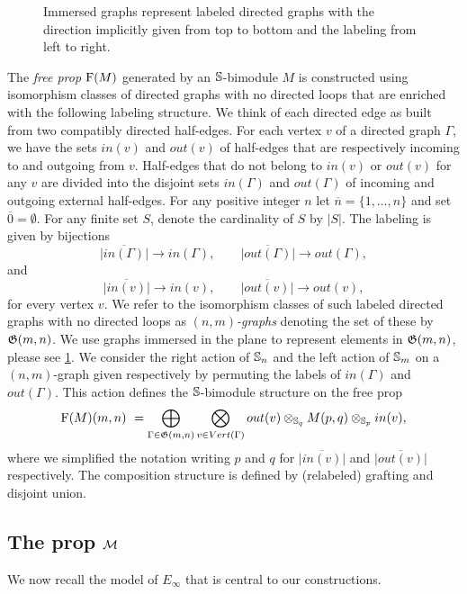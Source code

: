 \begin{figure}
	
	\caption{Immersed graphs represent labeled directed graphs with the direction implicitly given from top to bottom and the labeling from left to right.}
	\label{f:immersion}
\end{figure}

The \textit{free prop} $\free(M)$ generated by an $\S$-bimodule $M$ is constructed using isomorphism classes of directed graphs with no directed loops that are enriched with the following labeling structure.
We think of each directed edge as built from two compatibly directed half-edges.
For each vertex $v$ of a directed graph $\Gamma$, we have the sets $in(v)$ and $out(v)$ of half-edges that are respectively incoming to and outgoing from $v$.
Half-edges that do not belong to $in(v)$ or $out(v)$ for any $v$ are divided into the disjoint sets $in(\Gamma)$ and $out(\Gamma)$ of incoming and outgoing external half-edges.
For any positive integer $n$ let $\overline{n} = \{1, \dots, n\}$ and set $\overline{0} = \emptyset$.
For any finite set $S$, denote the cardinality of $S$ by $|S|$.
The labeling is given by bijections
\[
\overline{|in(\Gamma)|}\to in(\Gamma), \qquad
\overline{|out(\Gamma)|}\to out(\Gamma),
\]
and
\[
\overline{|in(v)|}\to in(v), \qquad
\overline{|out(v)|}\to out(v),
\]
for every vertex $v$.
We refer to the isomorphism classes of such labeled directed graphs with no directed loops as $(n,m)$\textit{-graphs} denoting the set of these by $\graphs(m,n)$.
We use graphs immersed in the plane to represent elements in $\graphs(m,n)$, please see \cref{f:immersion}.
We consider the right action of $\S_n$ and the left action of $\S_m$ on a $(n,m)$-graph given respectively by permuting the labels of $in(\Gamma)$ and $out(\Gamma)$.
This action defines the $\S$-bimodule structure on the free prop
\begin{equation} \label{e:free prop}
\free(M)(m,n) \ = \bigoplus_{\Gamma \in \graphs(m,n)} \bigotimes_{v \in Vert(\Gamma)} out(v) \ot_{\S_q} M(p, q) \ot_{\S_p} in(v),
\end{equation}
where we simplified the notation writing $p$ and $q$ for $\overline{|in(v)|}$ and $\overline{|out(v)|}$ respectively.
The composition structure is defined by (relabeled) grafting and disjoint union.

\subsection{The prop $\M$}

We now recall the model of $E_\infty$ that is central to our constructions.

